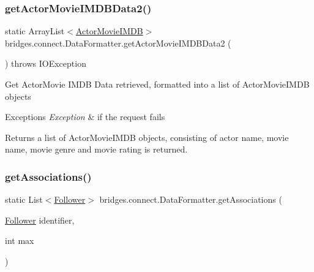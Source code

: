 \subsubsection{\texorpdfstring{getActorMovieIMDBData2()}{getActorMovieIMDBData2()}}
{\footnotesize\ttfamily static Array\+List$<$\mbox{\hyperlink{classbridges_1_1data__src__dependent_1_1_actor_movie_i_m_d_b}{Actor\+Movie\+I\+M\+DB}}$>$ bridges.\+connect.\+Data\+Formatter.\+get\+Actor\+Movie\+I\+M\+D\+B\+Data2 (\begin{DoxyParamCaption}{ }\end{DoxyParamCaption}) throws I\+O\+Exception\hspace{0.3cm}{\ttfamily [static]}}

Get Actor\+Movie I\+M\+DB Data retrieved, formatted into a list of Actor\+Movie\+I\+M\+DB objects


\begin{DoxyExceptions}{Exceptions}
{\em Exception} & if the request fails\\
\hline
\end{DoxyExceptions}
\begin{DoxyReturn}{Returns}
a list of Actor\+Movie\+I\+M\+DB objects, consisting of actor name, movie name, movie genre and movie rating is returned. 
\end{DoxyReturn}
\mbox{\label{classbridges_1_1connect_1_1_data_formatter_a3877fbdef4320f03dba7f2a6832adfbb}} 
\subsubsection{\texorpdfstring{getAssociations()}{getAssociations()}\hspace{0.1cm}{\footnotesize\ttfamily [1/5]}}
{\footnotesize\ttfamily static List$<$\mbox{\hyperlink{classbridges_1_1data__src__dependent_1_1_follower}{Follower}}$>$ bridges.\+connect.\+Data\+Formatter.\+get\+Associations (\begin{DoxyParamCaption}\item[{\mbox{\hyperlink{classbridges_1_1data__src__dependent_1_1_follower}{Follower}}}]{identifier,  }\item[{int}]{max }\end{DoxyParamCaption})\hspace{0.3cm}{\ttfamily [static]}}

